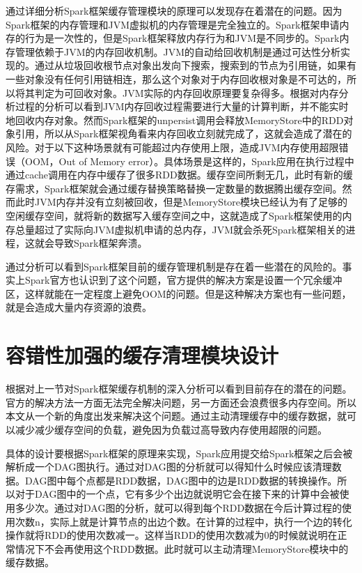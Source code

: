 通过详细分析Spark框架缓存管理模块的原理可以发现存在着潜在的问题。因为Spark框架的内存管理和JVM虚拟机的内存管理是完全独立的。Spark框架申请内存的行为是一次性的，但是Spark框架释放内存行为和JVM是不同步的。Spark内存管理依赖于JVM的内存回收机制。JVM的自动给回收机制是通过可达性分析实现的。通过从垃圾回收根节点对象出发向下搜索，搜索到的节点为引用链，如果有一些对象没有任何引用链相连，那么这个对象对于内存回收根对象是不可达的，所以将其判定为可回收对象。JVM实际的内存回收原理要复杂得多。根据对内存分析过程的分析可以看到JVM内存回收过程需要进行大量的计算判断，并不能实时地回收内存对象。然而Spark框架的unpersist调用会释放MemoryStore中的RDD对象引用，所以从Spark框架视角看来内存回收立刻就完成了，这就会造成了潜在的风险。对于以下这种场景就有可能超过内存使用上限，造成JVM内存使用超限错误（OOM，Out of Memory error）。具体场景是这样的，Spark应用在执行过程中通过cache调用在内存中缓存了很多RDD数据。缓存空间所剩无几，此时有新的缓存需求，Spark框架就会通过缓存替换策略替换一定数量的数据腾出缓存空间。然而此时JVM内存并没有立刻被回收，但是MemoryStore模块已经认为有了足够的空闲缓存空间，就将新的数据写入缓存空间之中，这就造成了Spark框架使用的内存总量超过了实际向JVM虚拟机申请的总内存，JVM就会杀死Spark框架相关的进程，这就会导致Spark框架奔溃。

通过分析可以看到Spark框架目前的缓存管理机制是存在着一些潜在的风险的。事实上Spark官方也认识到了这个问题，官方提供的解决方案是设置一个冗余缓冲区，这样就能在一定程度上避免OOM的问题。但是这种解决方案也有一些问题，就是会造成大量内存资源的浪费。

\section{容错性加强的缓存清理模块设计}

根据对上一节对Spark框架缓存机制的深入分析可以看到目前存在的潜在的问题。官方的解决方法一方面无法完全解决问题，另一方面还会浪费很多内存空间。所以本文从一个新的角度出发来解决这个问题。通过主动清理缓存中的缓存数据，就可以减少减少缓存空间的负载，避免因为负载过高导致内存使用超限的问题。

具体的设计要根据Spark框架的原理来实现，Spark应用提交给Spark框架之后会被解析成一个DAG图执行。通过对DAG图的分析就可以得知什么时候应该清理数据。DAG图中每个点都是RDD数据，DAG图中的边是RDD数据的转换操作。所以对于DAG图中的一个点，它有多少个出边就说明它会在接下来的计算中会被使用多少次。通过对DAG图的分析，就可以得到每个RDD数据在今后计算过程的使用次数n，实际上就是计算节点的出边个数。在计算的过程中，执行一个边的转化操作就将RDD的使用次数减一。这样当RDD的使用次数减为0的时候就说明在正常情况下不会再使用这个RDD数据。此时就可以主动清理MemoryStore模块中的缓存数据。

